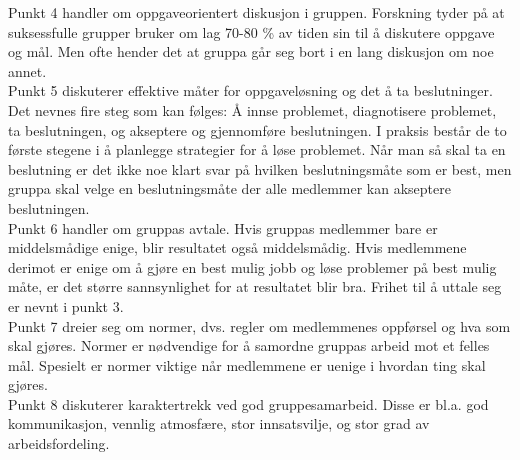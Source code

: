 Punkt 4 handler om oppgaveorientert diskusjon i gruppen. Forskning tyder på at suksessfulle grupper bruker om lag 70-80 \% av tiden sin til å diskutere oppgave og mål. Men ofte hender det at gruppa går seg bort i en lang diskusjon om noe annet. \\

Punkt 5 diskuterer effektive måter for oppgaveløsning og det å ta beslutninger. Det nevnes fire steg som kan følges: Å innse problemet, diagnotisere problemet, ta beslutningen, og akseptere og gjennomføre beslutningen. I praksis består de to første stegene i å planlegge strategier for å løse problemet. Når man så skal ta en beslutning er det ikke noe klart svar på hvilken beslutningsmåte som er best, men gruppa skal velge en beslutningsmåte der alle medlemmer kan akseptere beslutningen.  \\

Punkt 6 handler om gruppas avtale. Hvis gruppas medlemmer bare er middelsmådige enige, blir resultatet også middelsmådig. Hvis medlemmene derimot er enige om å gjøre en best mulig jobb og løse problemer på best mulig måte, er det større sannsynlighet for at resultatet blir bra. Frihet til å uttale seg er nevnt i punkt 3. \\

Punkt 7 dreier seg om normer, dvs. regler om medlemmenes oppførsel og hva som skal gjøres. Normer er nødvendige for å samordne gruppas arbeid mot et felles mål. Spesielt er normer viktige når medlemmene er uenige i hvordan ting skal gjøres. \\

Punkt 8 diskuterer karaktertrekk ved god gruppesamarbeid. Disse er bl.a. god kommunikasjon, vennlig atmosfære, stor innsatsvilje, og stor grad av arbeidsfordeling.

